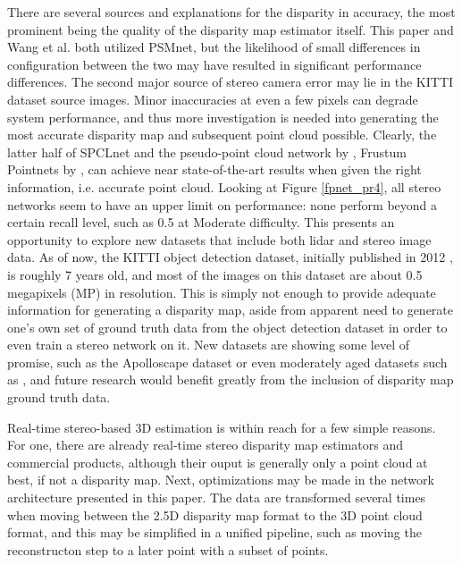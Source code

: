 There are several sources and explanations for the disparity in accuracy, the most prominent being the quality of the disparity map estimator itself. This paper and Wang et al. \cite{wang_pseudo-lidar_2019} both utilized PSMnet, but the likelihood of small differences in configuration between the two may have resulted in significant performance differences. The second major source of stereo camera error may lie in the KITTI dataset source images. Minor inaccuracies at even a few pixels can degrade system performance, and thus more investigation is needed into generating the most accurate disparity map and subsequent point cloud possible. Clearly, the latter half of SPCLnet and the pseudo-point cloud network by \cite{wang_pseudo-lidar_2019}, Frustum Pointnets by \cite{qi_frustum_2017}, can achieve near state-of-the-art results when given the right information, i.e. accurate point cloud. Looking at Figure \ref{fpnet_pr4}, all stereo networks seem to have an upper limit on performance: none perform beyond a certain recall level, such as 0.5 at Moderate difficulty. This presents an opportunity to explore new datasets that include both lidar and stereo image data. As of now, the KITTI object detection dataset, initially published in 2012 \cite{geiger_are_2012}, is roughly 7 years old, and most of the images on this dataset are about 0.5 megapixels (MP) in resolution. This is simply not enough to provide adequate information for generating a disparity map, aside from apparent need to generate one's own set of ground truth data from the object detection dataset in order to even train a stereo network on it. New datasets are showing some level of promise, such as the Apolloscape dataset \cite{huang_apolloscape_2018} or even moderately aged datasets such as \cite{cordts_cityscapes_2016}, and future research would benefit greatly from the inclusion of disparity map ground truth data.

Real-time stereo-based 3D estimation is within reach for a few simple reasons. For one, there are already real-time stereo disparity map estimators and commercial products, although their ouput is generally only a point cloud at best, if not a disparity map. Next, optimizations may be made in the network architecture presented in this paper. The data are transformed several times when moving between the 2.5D disparity map format to the 3D point cloud format, and this may be simplified in a unified pipeline, such as moving the reconstructon step to a later point with a subset of points. 


